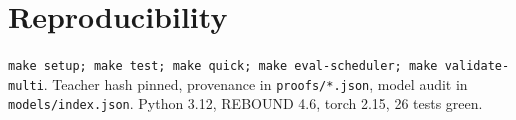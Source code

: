 \documentclass[11pt]{article}
\begin{document}
\section{Reproducibility}
\texttt{make setup; make test; make quick; make eval-scheduler; make validate-multi}. Teacher hash pinned, provenance in \texttt{proofs/*.json}, model audit in \texttt{models/index.json}. Python 3.12, REBOUND 4.6, torch 2.15, 26 tests green.



\end{document}
